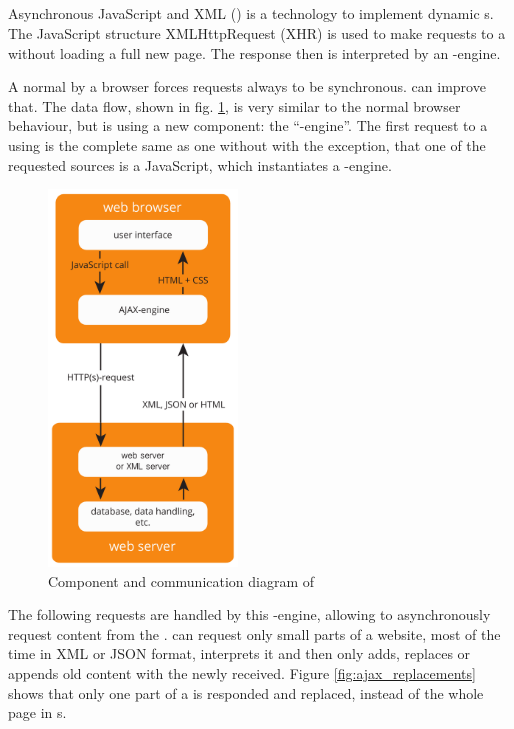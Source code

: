 \subsection{\ajax{}\label{ajax}}
Asynchronous JavaScript and XML (\ajax{}) is a technology to implement dynamic \webPage{}s.
The JavaScript structure XMLHttpRequest (XHR) is used to make requests to a \webServer{} without loading a full new page.
The response then is interpreted by an \ajax{}-engine.

A normal \httpRequest{} by a browser forces requests always to be synchronous.
\ajax{} can improve that.
The data flow, shown in fig. \ref{fig:ajax_components}, is very similar to the normal browser behaviour, but is using a new component: the \enquote{\ajax{}-engine}.
The first request to a \webServer{} using \ajax{} is the complete same as one without \ajax{} with the exception, that one of the requested sources is a JavaScript, which instantiates a \ajax{}-engine.

\begin{figure}[H]
\centering 
\includegraphics[height=10cm]{images/ajax.pdf}
\caption[ajax_components]{Component and communication diagram of \ajax{}}
\label{fig:ajax_components}
\end{figure}

\noindent{}The following requests are handled by this \ajax{}-engine, allowing to asynchronously request content from the \webServer{}.
\ajax{} can request only small parts of a website, most of the time in XML or JSON format, interprets it and then only adds, replaces or appends old content with the newly received.
Figure \ref{fig:ajax_replacements} shows that only one part of a \webPage{} is responded and replaced, instead of the whole page in \httpRequest{}s.


